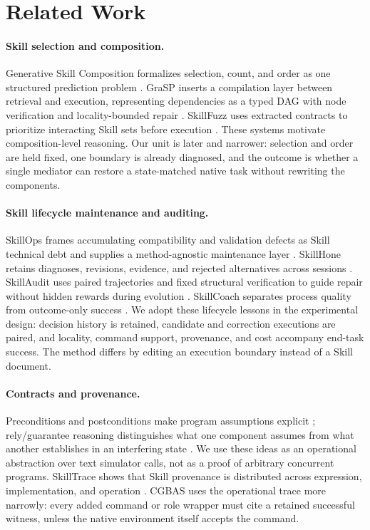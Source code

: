 \documentclass[10pt]{article}
\begin{document}
\section{Related Work}

\paragraph{Skill selection and composition.}
Generative Skill Composition formalizes selection, count, and order as one
structured prediction problem \citep{zhao2026skillcomposer}. GraSP inserts a
compilation layer between retrieval and execution, representing dependencies as
a typed DAG with node verification and locality-bounded repair
\citep{xia2026grasp}. SkillFuzz uses extracted contracts to prioritize interacting
Skill sets before execution \citep{hu2026skillfuzz}. These systems motivate
composition-level reasoning. Our unit is later and narrower: selection and order
are held fixed, one boundary is already diagnosed, and the outcome is whether a
single mediator can restore a state-matched native task without rewriting the
components.

\paragraph{Skill lifecycle maintenance and auditing.}
SkillOps frames accumulating compatibility and validation defects as Skill
technical debt and supplies a method-agnostic maintenance layer
\citep{pu2026skillops}. SkillHone retains diagnoses, revisions, evidence, and
rejected alternatives across sessions \citep{li2026skillhone}. SkillAudit uses
paired trajectories and fixed structural verification to guide repair without
hidden rewards during evolution \citep{gao2026skillaudit}. SkillCoach separates
process quality from outcome-only success \citep{zhu2026skillcoach}. We adopt
these lifecycle lessons in the experimental design: decision history is retained,
candidate and correction executions are paired, and locality, command support,
provenance, and cost accompany end-task success. The method differs by editing an
execution boundary instead of a Skill document.

\paragraph{Contracts and provenance.}
Preconditions and postconditions make program assumptions explicit
\citep{hoare1969axiomatic,meyer1992contract}; rely/guarantee reasoning distinguishes
what one component assumes from what another establishes in an interfering state
\citep{jones1983rely}. We use these ideas as an operational abstraction over text
simulator calls, not as a proof of arbitrary concurrent programs. SkillTrace
shows that Skill provenance is distributed across expression, implementation,
and operation \citep{chen2026multitrace}. CGBAS uses the operational trace more
narrowly: every added command or role wrapper must cite a retained successful
witness, unless the native environment itself accepts the command.
\end{document}
